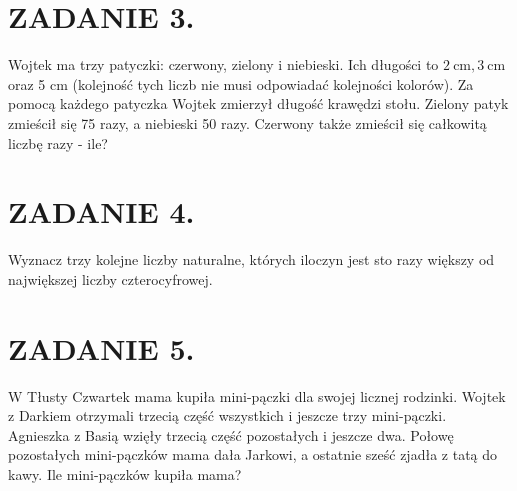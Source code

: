 \documentclass[10pt]{article}
\begin{document}
\section*{ZADANIE 3.}
Wojtek ma trzy patyczki: czerwony, zielony i niebieski. Ich długości to \(2 \mathrm{~cm}, 3 \mathrm{~cm}\) oraz 5 cm (kolejność tych liczb nie musi odpowiadać kolejności kolorów). Za pomocą każdego patyczka Wojtek zmierzył długość krawędzi stołu. Zielony patyk zmieścił się 75 razy, a niebieski 50 razy. Czerwony także zmieścił się całkowitą liczbę razy - ile?

\section*{ZADANIE 4.}
Wyznacz trzy kolejne liczby naturalne, których iloczyn jest sto razy większy od największej liczby czterocyfrowej.

\section*{ZADANIE 5.}
W Tłusty Czwartek mama kupiła mini-pączki dla swojej licznej rodzinki. Wojtek z Darkiem otrzymali trzecią część wszystkich i jeszcze trzy mini-pączki. Agnieszka z Basią wzięły trzecią część pozostałych i jeszcze dwa. Połowę pozostałych mini-pączków mama dała Jarkowi, a ostatnie sześć zjadła z tatą do kawy. Ile mini-pączków kupiła mama?
\end{document}
